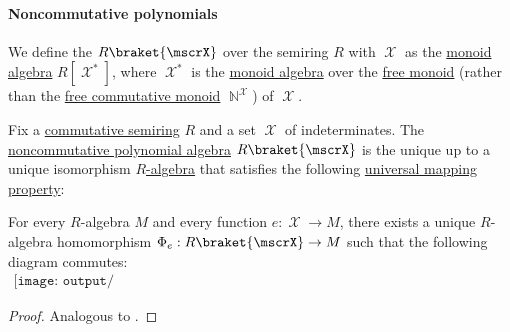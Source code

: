 \paragraph{Noncommutative polynomials}

\begin{definition}\label{def:noncommutative_polynomial_algebra}
  We define the  \( R\braket{ \mscrX } \) over the semiring \( R \) with  \( \mscrX \) as the \hyperref[def:semigroup_algebra]{monoid algebra} \( R[\mscrX^*] \), where \( \mscrX^* \) is the
  \hyperref[def:semigroup_algebra]{monoid algebra} over the \hyperref[def:free_monoid]{free monoid} (rather than the \hyperref[def:free_commutative_monoid]{free commutative monoid} \( \BbbN^\mscrX \)) of \( \mscrX \).
\end{definition}

\begin{theorem}\label{thm:noncommutative_polynomial_algebra_universal_property}
  Fix a \hyperref[def:semiring/commutative]{commutative semiring} \( R \) and a set \( \mscrX \) of indeterminates. The \hyperref[def:noncommutative_polynomial_algebra]{noncommutative polynomial algebra} \( R\braket{\mscrX} \) is the unique up to a unique isomorphism \hyperref[def:algebra_over_semiring]{\( R \)-algebra} that satisfies the following \hyperref[rem:universal_mapping_property]{universal mapping property}:
  \begin{displayquote}
    For every \( R \)-algebra \( M \) and every function \( e: \mscrX \to M \), there exists a unique \( R \)-algebra homomorphism \( \Phi_e: R\braket{\mscrX} \to M \) such that the following diagram commutes:
    \begin{equation}\label{eq:thm:noncommutative_polynomial_algebra_universal_property/diagram}
      \begin{aligned}
        \texttt{[image: output/thm\_\_noncommutative\_polynomial\_algebra\_universal\_property]}
      \end{aligned}
    \end{equation}
  \end{displayquote}
\end{theorem}
\begin{proof}
  Analogous to .
\end{proof}
